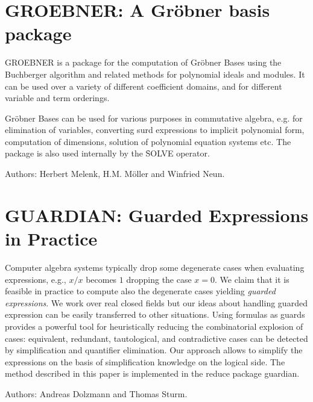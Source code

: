 \section{GROEBNER: A Gr\"{o}bner basis package}
\label{GROEBNER}

GROEBNER is a package for the computation of Gr\"obner
Bases using the Buchberger algorithm and related methods
for polynomial ideals and modules.  It can be used over a variety of
different coefficient domains, and for different variable and term
orderings.

Gr\"obner Bases can be used for various purposes in commutative
algebra, e.g. for elimination of variables,
converting surd expressions to implicit polynomial form,
computation of dimensions, solution of polynomial equation systems
 etc.
The package is also used internally by the \f{SOLVE}
operator.

Authors: Herbert Melenk, H.M. M\"oller and Winfried Neun.



\newpage

\section{GUARDIAN: Guarded Expressions in Practice}
\label{GUARDIAN}

Computer algebra systems typically drop some degenerate cases when
evaluating expressions, e.g., $x/x$ becomes $1$ dropping the case
$x=0$. We claim that it is feasible in practice to compute also the
degenerate cases yielding {\em guarded expressions}. We work over real
closed fields but our ideas about handling guarded expression can be
easily transferred to other situations. Using formulas as guards
provides a powerful tool for heuristically reducing the combinatorial
explosion of cases: equivalent, redundant, tautological, and
contradictive cases can be detected by simplification and quantifier
elimination. Our approach allows to simplify the expressions on the
basis of simplification knowledge on the logical side. The method
described in this paper is implemented in the {\sc reduce} package
{\sc guardian}.

Authors: Andreas Dolzmann and Thomas Sturm.



\newpage


